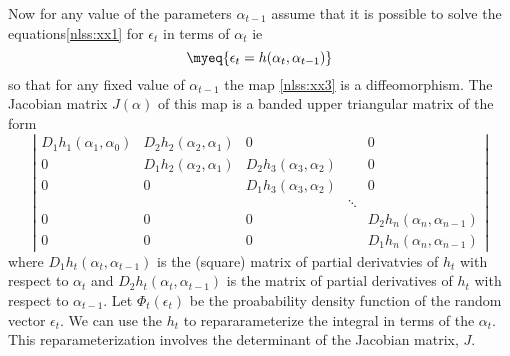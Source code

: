 Now for any value of the parameters $\alpha_{t-1}$
assume that it is possible to solve the  equations\ref{nlss:xx1}
for  $\epsilon_t$ in terms of $\alpha_t$ ie
\begin{equation}
 \myeq{\epsilon_t=h(\alpha_t,\alpha_{t-1})}\label{nlss:xx3}
\end{equation}
so that for any fixed value of $\alpha_{t-1}$ the map \ref{nlss:xx3}
is a diffeomorphism. The Jacobian matrix $J(\alpha)$ of this map
is a banded upper triangular matrix of the form
\[
\left | \begin{array}{ccccc}
   D_1h_1(\alpha_1,\alpha_0) & D_2h_2(\alpha_2,\alpha_1)  & 0 &  & 0 \\
     0                    & D_1h_2(\alpha_2,\alpha_1)  &  D_2h_3(\alpha_3,\alpha_2) & & 0  \\ 
     0                    &  0                        &  D_1h_3(\alpha_3,\alpha_2)  & & 0\\
                          &                           &                & \ddots \\
     0                    & 0                         &    0           &           & D_2h_n(\alpha_n,\alpha_{n-1}) \\
     0                    & 0                         &    0           &           & D_1h_n(\alpha_n,\alpha_{n-1}) 
 
   \end{array}
  \right |
\]
where $D_1h_t(\alpha_t,\alpha_{t-1})$ is the (square) matrix of partial derivatvies of $h_t$ with respect to  $\alpha_t$ and 
 $D_2h_t(\alpha_t,\alpha_{t-1})$ is the matrix of partial derivatives 
of $h_t$ with respect to  $\alpha_{t-1}$. 
Let $\Phi_t(\epsilon_t)$ be the proabability density function of
the random vector $\epsilon_t$.  We can use the $h_t$  to
repararameterize the integral  in terms of the $\alpha_t$. 
This reparameterization involves the determinant of the Jacobian matrix, $J$.
 
